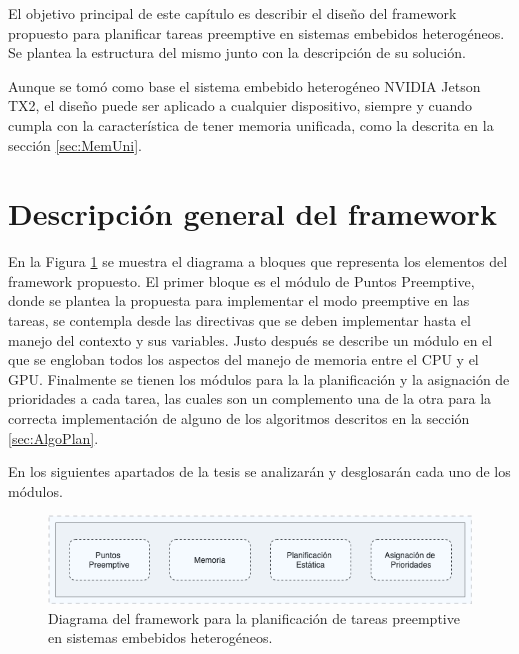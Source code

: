 



El objetivo principal de este capítulo es describir el diseño del framework propuesto para planificar tareas preemptive en sistemas embebidos heterogéneos. Se plantea la estructura del mismo junto con la descripción de su solución. 

Aunque se tomó como base el sistema embebido heterogéneo NVIDIA Jetson TX2, el diseño puede ser aplicado a cualquier dispositivo, siempre y cuando cumpla con la característica de tener memoria unificada, como la descrita en la sección \ref{sec:MemUni}.

\section{Descripción general del framework}

En la Figura \ref{fig:diagramabase} se muestra el diagrama a bloques que representa los elementos del framework propuesto. El primer bloque es el módulo de Puntos Preemptive, donde se plantea la propuesta para implementar el modo preemptive en las tareas, se contempla desde las directivas que se deben implementar hasta el manejo del contexto y sus variables. Justo después se describe un módulo en el que se engloban todos los aspectos del manejo de memoria entre el CPU y el GPU. Finalmente se tienen los módulos para la la planificación y la asignación de prioridades a cada tarea, las cuales son un complemento una de la otra para la correcta implementación de alguno de los algoritmos descritos en la sección \ref{sec:AlgoPlan}.

\vspace{0.3cm}

En los siguientes apartados de la tesis se analizarán y desglosarán cada uno de los módulos.
  \begin{figure}[ht]
      \centering
        \includegraphics[scale=.8]{img/diagrama_framework}
        \caption{Diagrama del framework para la planificación de tareas preemptive en sistemas embebidos heterogéneos.}
        \label{fig:diagramabase}
    \end{figure}
  

